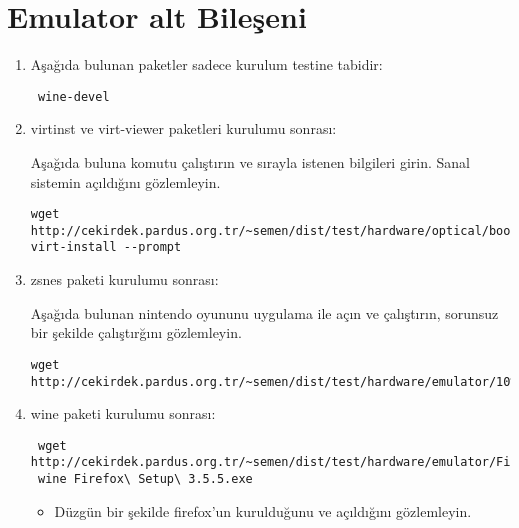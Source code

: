 \documentclass[a4paper,10pt]{article}
\begin{document}
\section{Emulator alt Bileşeni}
\begin{enumerate}
\item Aşağıda bulunan paketler sadece kurulum testine tabidir:

\begin{verbatim}
 wine-devel
\end{verbatim}
\item virtinst ve virt-viewer paketleri kurulumu sonrası:

Aşağıda buluna  komutu çalıştırın ve sırayla istenen bilgileri girin. Sanal sistemin açıldığını gözlemleyin.
\begin{verbatim}
wget http://cekirdek.pardus.org.tr/~semen/dist/test/hardware/optical/boot.iso
virt-install --prompt
\end{verbatim}

 \item zsnes paketi kurulumu sonrası:

Aşağıda bulunan nintendo oyununu uygulama ile açın ve çalıştırın, sorunsuz bir şekilde çalıştırğını gözlemleyin.
\begin{verbatim}
wget http://cekirdek.pardus.org.tr/~semen/dist/test/hardware/emulator/10%20Yard%20Fight%20(A&S%20NES%20Hack).smc 
\end{verbatim}

 \item wine paketi kurulumu sonrası:
\begin{verbatim}
 wget http://cekirdek.pardus.org.tr/~semen/dist/test/hardware/emulator/Firefox%20Setup%203.5.5.exe
 wine Firefox\ Setup\ 3.5.5.exe
\end{verbatim}
\begin{itemize}
 \item Düzgün bir şekilde firefox'un kurulduğunu ve açıldığını gözlemleyin.
 \end{itemize}

\end{enumerate}
\end{document}
